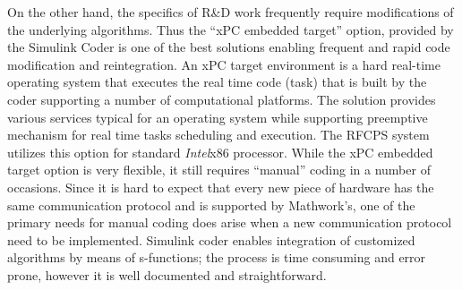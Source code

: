 \documentclass[letterpaper, 10 pt, conference]{ieeeconf}  %
\begin{document}
On the other hand, the specifics of R\&D work frequently require modifications of the underlying algorithms. Thus the ``xPC embedded target'' option, provided by the Simulink Coder is one of the best solutions  enabling frequent and rapid code modification and reintegration. An xPC target environment is a hard real-time operating system that executes the real time code (task) that is built by the coder supporting a number of computational platforms. The solution provides various services typical for an operating system while supporting preemptive mechanism  for real time tasks scheduling and execution. The RFCPS system utilizes this option for standard \emph{Intel}x$86$ processor. While the xPC embedded target option is very flexible, it still requires ``manual'' coding in a number of occasions. Since it is hard to expect that every new piece of hardware has the same communication protocol and is supported by Mathwork's, one of the primary needs for manual coding does arise when a new communication protocol need to be implemented. Simulink coder enables integration of customized algorithms by means of s-functions; the process is time consuming and error prone, however it is well documented and straightforward. 
\end{document}
